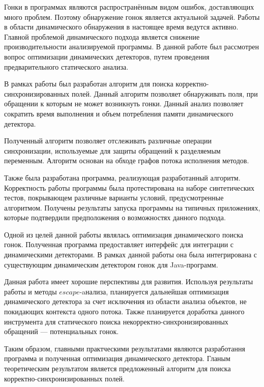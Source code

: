 \startconclusionpage

Гонки в программах являются распространённым видом ошибок, доставляющих много проблем. Поэтому обнаружение гонок является актуальной задачей. Работы в области динамического обнаружения в настоящее время ведутся активно. Главной проблемой динамического подхода является снижение производительности анализируемой программы.
В данной работе был рассмотрен вопрос оптимизации динамических детекторов, путем проведения предварительного  статического анализа.

В рамках работы был разработан алгоритм для поиска корректно-синхронизированных полей. Данный алгоритм позволяет обнаруживать поля, при обращении к которым не может возникнуть гонки. Данный анализ позволяет сократить время выполнения и объем потребления памяти динамического детектора.

Полученный алгоритм позволяет отслеживать различные операции синхронизации, используемые для защиты обращений к разделяемым переменным. Алгоритм основан на обходе графов потока исполнения методов. 

Также была разработана программа, реализующая разработанный алгоритм. 
Корректность работы программы была протестирована на наборе синтетических тестов, покрывающем различные варианты условий, предусмотренные алгоритмом. Получены результаты запуска программы на типичных приложениях, которые подтвердили предположения о возможностях данного подхода.

Одной из целей данной работы являлась оптимизация динамического поиска гонок. Полученная программа предоставляет интерфейс для интеграции с динамическими детекторами. В рамках данной работы она была интегрирована с существующим динамическим детектором гонок для Java-программ. 

Данная работа имеет хорошие перспективы для развития. Используя результаты работы и методы $escape$-aнализа, планируется
дальнейшая оптимизация динамического детектора за счет исключения из области анализа объектов, не покидающих контекста одного потока. Также планируется доработка данного инструмента для статического поиска некорректно-синхронизированных обращений --- потенциальных гонок.

Таким образом, главными практческими результатами являются разработання программа и полученная оптимизация динамического детектора. Гланым теоретическим результатом является предложенный алгоритм для поиска корректно-синхронизированных полей. 


\FloatBarrier
